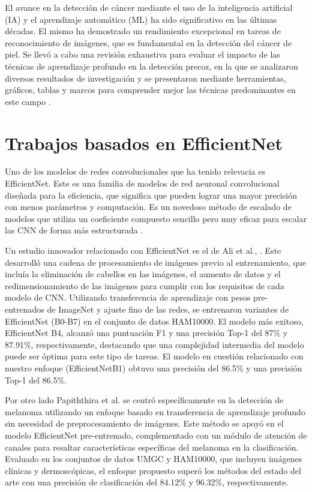 El avance en la detección de cáncer mediante el uso de la inteligencia artificial (IA) y el aprendizaje automático (ML) ha sido significativo en las últimas décadas. El mismo ha demostrado un rendimiento excepcional en tareas de reconocimiento de imágenes, que es fundamental en la detección del cáncer de piel. Se llevó a cabo una revisión exhaustiva para evaluar el impacto de las técnicas de aprendizaje profundo en la detección precoz, en la que se analizaron diversos resultados de investigación y se presentaron mediante herramientas, gráficos, tablas y marcos para comprender mejor las técnicas predominantes en este campo .

\section {Trabajos basados en EfficientNet}

Uno de los modelos de redes convolucionales que ha tenido relevacia es EfficientNet. Este es una familia de modelos de red neuronal convolucional diseñada para la eficiencia, que significa que pueden lograr una mayor precisión con menos parámetros y computación. Es un novedoso método de escalado de modelos que utiliza un coeficiente compuesto sencillo pero muy eficaz para escalar las CNN de forma más estructurada .

Un estudio innovador relacionado con EfficientNet es el de Ali et al., . Este desarrolló una cadena de procesamiento de imágenes previo al entrenamiento, que incluía la eliminación de cabellos en las imágenes, el aumento de datos y el redimensionamiento de las imágenes para cumplir con los requisitos de cada modelo de CNN. Utilizando transferencia de aprendizaje con pesos pre-entrenados de ImageNet y ajuste fino de las redes, se entrenaron variantes de EfficientNet (B0-B7) en el conjunto de datos HAM10000. El modelo más exitoso, EfficientNet B4, alcanzó una puntuación F1 y una precisión Top-1 del 87\% y 87.91\%, respectivamente, destacando que una complejidad intermedia del modelo puede ser óptima para este tipo de tareas. El modelo en cuestión relacionado con nuestro enfoque (EfficientNetB1) obtuvo una precisión del 86.5\% y una precisión Top-1 del 86.5\%.

Por otro lado Papiththira et al.  se centró específicamente en la detección de melanoma utilizando un enfoque basado en transferencia de aprendizaje profundo sin necesidad de preprocesamiento de imágenes. Este método se apoyó en el modelo EfficientNet pre-entrenado, complementado con un módulo de atención de canales para resaltar características específicas del melanoma en la clasificación. Evaluado en los conjuntos de datos UMGC y HAM10000, que incluyen imágenes clínicas y dermoscópicas, el enfoque propuesto superó los métodos del estado del arte con una precisión de clasificación del 84.12\% y 96.32\%, respectivamente.

